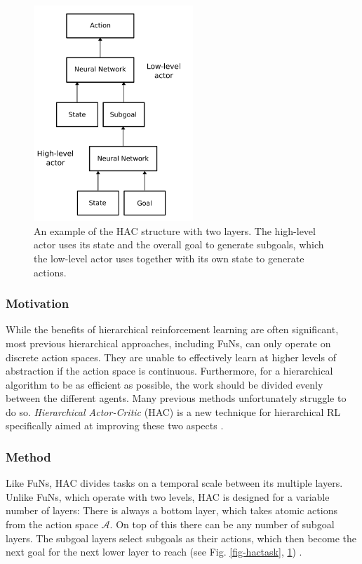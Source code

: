\documentclass[runningheads]{llncs}
\begin{document}
\begin{figure}
    \centering
    \includegraphics[width=6cm]{submission/figures/figure-hierarchy.pdf}
    \caption{An example of the HAC structure with two layers. The high-level actor uses its state and the overall goal to generate subgoals, which the low-level actor uses together with its own state to generate actions. \cite{levy2017hierarchical}}
    \label{fig-hierarchy}
\end{figure}

\subsubsection{Motivation}

While the benefits of hierarchical reinforcement learning are often significant, most previous hierarchical approaches, including FuNs, can only operate on discrete action spaces. They are unable to effectively learn at higher levels of abstraction if the action space is continuous. Furthermore, for a hierarchical algorithm to be as efficient as possible, the work should be divided evenly between the different agents. Many previous methods unfortunately struggle to do so. \textit{Hierarchical Actor-Critic} (HAC) is a new technique for hierarchical RL specifically aimed at improving these two aspects \cite{levy2017hierarchical}.

\subsubsection{Method}

Like FuNs, HAC divides tasks on a temporal scale between its multiple layers. Unlike FuNs, which operate with two levels, HAC is designed for a variable number of layers: There is always a bottom layer, which takes atomic actions from the action space $\mathcal{A}$. On top of this there can be any number of subgoal layers. The subgoal layers select subgoals as their actions, which then become the next goal for the next lower layer to reach (see Fig. \ref{fig-hactask}, \ref{fig-hierarchy}) \cite{levy2017hierarchical}.
\end{document}
